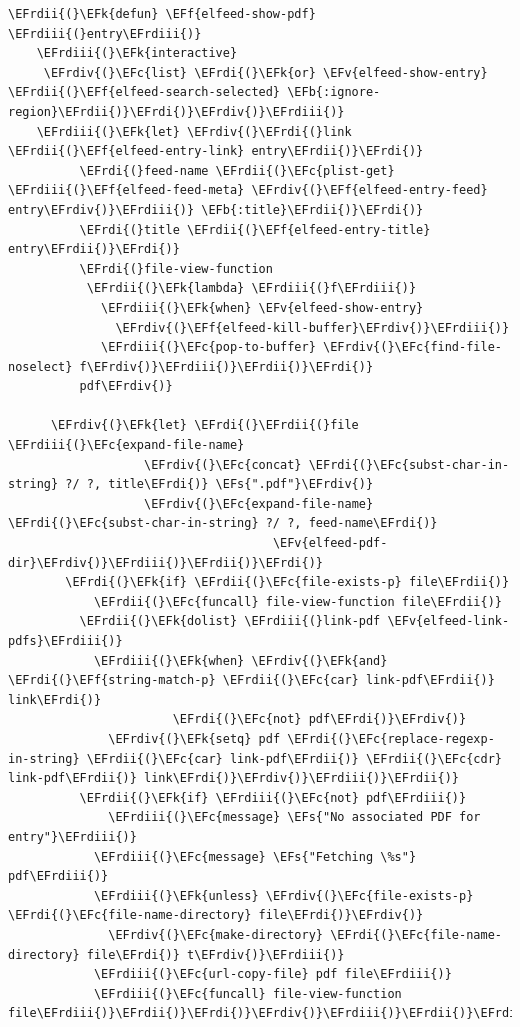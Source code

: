 \documentclass{scrartcl}
\newcommand{\EFk}[1]{\textcolor{EFk}{#1}} %
\newcommand{\EFs}[1]{\textcolor{EFs}{#1}} %
\newcommand{\EFb}[1]{\textcolor{EFb}{#1}} %
\newcommand{\EFc}[1]{\textcolor{EFc}{#1}} %
\newcommand{\EFv}[1]{\textcolor{EFv}{#1}} %
\newcommand{\EFf}[1]{\textcolor{EFf}{#1}} %
\newcommand{\EFrdi}[1]{#1} %
\newcommand{\EFrdii}[1]{#1} %
\newcommand{\EFrdiii}[1]{#1} %
\newcommand{\EFrdiv}[1]{#1} %
\begin{document}
\begin{Code}
\begin{Verbatim}[]
  \EFrdii{(}\EFk{defun} \EFf{elfeed-show-pdf} \EFrdiii{(}entry\EFrdiii{)}
    \EFrdiii{(}\EFk{interactive}
     \EFrdiv{(}\EFc{list} \EFrdi{(}\EFk{or} \EFv{elfeed-show-entry} \EFrdii{(}\EFf{elfeed-search-selected} \EFb{:ignore-region}\EFrdii{)}\EFrdi{)}\EFrdiv{)}\EFrdiii{)}
    \EFrdiii{(}\EFk{let} \EFrdiv{(}\EFrdi{(}link \EFrdii{(}\EFf{elfeed-entry-link} entry\EFrdii{)}\EFrdi{)}
          \EFrdi{(}feed-name \EFrdii{(}\EFc{plist-get} \EFrdiii{(}\EFf{elfeed-feed-meta} \EFrdiv{(}\EFf{elfeed-entry-feed} entry\EFrdiv{)}\EFrdiii{)} \EFb{:title}\EFrdii{)}\EFrdi{)}
          \EFrdi{(}title \EFrdii{(}\EFf{elfeed-entry-title} entry\EFrdii{)}\EFrdi{)}
          \EFrdi{(}file-view-function
           \EFrdii{(}\EFk{lambda} \EFrdiii{(}f\EFrdiii{)}
             \EFrdiii{(}\EFk{when} \EFv{elfeed-show-entry}
               \EFrdiv{(}\EFf{elfeed-kill-buffer}\EFrdiv{)}\EFrdiii{)}
             \EFrdiii{(}\EFc{pop-to-buffer} \EFrdiv{(}\EFc{find-file-noselect} f\EFrdiv{)}\EFrdiii{)}\EFrdii{)}\EFrdi{)}
          pdf\EFrdiv{)}

      \EFrdiv{(}\EFk{let} \EFrdi{(}\EFrdii{(}file \EFrdiii{(}\EFc{expand-file-name}
                   \EFrdiv{(}\EFc{concat} \EFrdi{(}\EFc{subst-char-in-string} ?/ ?, title\EFrdi{)} \EFs{".pdf"}\EFrdiv{)}
                   \EFrdiv{(}\EFc{expand-file-name} \EFrdi{(}\EFc{subst-char-in-string} ?/ ?, feed-name\EFrdi{)}
                                     \EFv{elfeed-pdf-dir}\EFrdiv{)}\EFrdiii{)}\EFrdii{)}\EFrdi{)}
        \EFrdi{(}\EFk{if} \EFrdii{(}\EFc{file-exists-p} file\EFrdii{)}
            \EFrdii{(}\EFc{funcall} file-view-function file\EFrdii{)}
          \EFrdii{(}\EFk{dolist} \EFrdiii{(}link-pdf \EFv{elfeed-link-pdfs}\EFrdiii{)}
            \EFrdiii{(}\EFk{when} \EFrdiv{(}\EFk{and} \EFrdi{(}\EFf{string-match-p} \EFrdii{(}\EFc{car} link-pdf\EFrdii{)} link\EFrdi{)}
                       \EFrdi{(}\EFc{not} pdf\EFrdi{)}\EFrdiv{)}
              \EFrdiv{(}\EFk{setq} pdf \EFrdi{(}\EFc{replace-regexp-in-string} \EFrdii{(}\EFc{car} link-pdf\EFrdii{)} \EFrdii{(}\EFc{cdr} link-pdf\EFrdii{)} link\EFrdi{)}\EFrdiv{)}\EFrdiii{)}\EFrdii{)}
          \EFrdii{(}\EFk{if} \EFrdiii{(}\EFc{not} pdf\EFrdiii{)}
              \EFrdiii{(}\EFc{message} \EFs{"No associated PDF for entry"}\EFrdiii{)}
            \EFrdiii{(}\EFc{message} \EFs{"Fetching \%s"} pdf\EFrdiii{)}
            \EFrdiii{(}\EFk{unless} \EFrdiv{(}\EFc{file-exists-p} \EFrdi{(}\EFc{file-name-directory} file\EFrdi{)}\EFrdiv{)}
              \EFrdiv{(}\EFc{make-directory} \EFrdi{(}\EFc{file-name-directory} file\EFrdi{)} t\EFrdiv{)}\EFrdiii{)}
            \EFrdiii{(}\EFc{url-copy-file} pdf file\EFrdiii{)}
            \EFrdiii{(}\EFc{funcall} file-view-function file\EFrdiii{)}\EFrdii{)}\EFrdi{)}\EFrdiv{)}\EFrdiii{)}\EFrdii{)}\EFrdi{)}
\end{Verbatim}
\end{Code}
\end{document}

